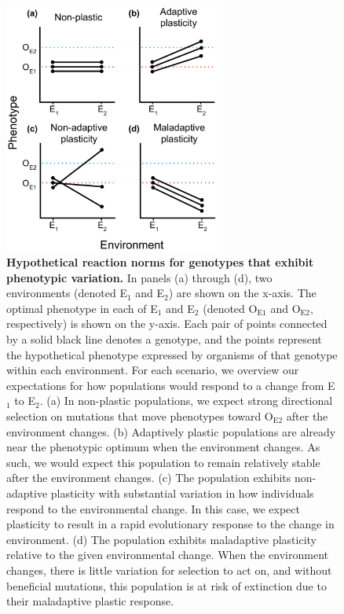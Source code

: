 \begin{figure}[ht!]
    \centering
    \includegraphics[width=0.65\textwidth]{media/reaction-norms.pdf}
    \caption{\small
    \textbf{Hypothetical reaction norms for genotypes that exhibit phenotypic variation.}
    In panels (a) through (d), two environments (denoted E$_1$ and E$_2$) are shown on the x-axis.
    The optimal phenotype in each of E$_1$ and E$_2$ (denoted O$_{\text{E}1}$ and O$_{\text{E}2}$, respectively) is shown on the y-axis.
    Each pair of points connected by a solid black line denotes a genotype, and the points represent the hypothetical phenotype expressed by organisms of that genotype within each environment.
    For each scenario, we overview our expectations for how populations would respond to a change from E$_1$ to E$_2$.
    (a) In non-plastic populations, we expect strong directional selection on mutations that move phenotypes toward O$_{\text{E}2}$ after the environment changes.
    (b) Adaptively plastic populations are already near the phenotypic optimum when the environment changes. As such, we would expect this population to remain relatively stable after the environment changes.
    (c) The population exhibits non-adaptive plasticity with substantial variation in how individuals respond to the environmental change. In this case, we expect plasticity to result in a rapid evolutionary response to the change in environment.
    (d) The population exhibits maladaptive plasticity relative to the given environmental change. When the environment changes, there is little variation for selection to act on, and without beneficial mutations, this population is at risk of extinction due to their maladaptive plastic response. 
    }
    \label{fig:reaction-norms}
\end{figure}

